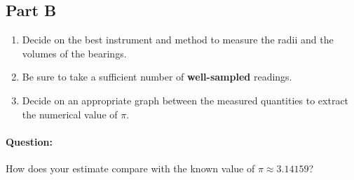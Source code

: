 \subsection{Part B}

\begin{enumerate}
    \item Decide on the best instrument and method to measure the radii and the volumes of the bearings.
    
    \item Be sure to take a sufficient number of \textbf{well-sampled} readings.
    
    \item Decide on an appropriate graph between the measured quantities to extract the numerical value of $\pi$.
\end{enumerate}

\begin{question}
\paragraph{Question:} How does your estimate compare with the known value of $\pi \approx 3.14159$?
\end{question}



\newpage